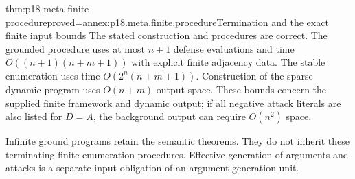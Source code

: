 \begin{hbtheorem}{thm:p18-meta-finite-procedure}{proved=annex:p18.meta.finite.procedure}{Termination and the exact finite input bounds}
The stated construction and procedures are correct.
The grounded procedure uses at most \(n+1\) defense evaluations
and time \(O((n+1)(n+m+1))\) with explicit finite adjacency data.
The stable enumeration uses time \(O(2^n(n+m+1))\).
Construction of the sparse dynamic program uses \(O(n+m)\)
output space. These bounds concern the supplied finite framework
and dynamic output; if all negative attack literals are also
listed for \(D=A\), the background output can require \(O(n^2)\)
space.

Infinite ground programs retain the semantic theorems. They do
not inherit these terminating finite enumeration procedures.
Effective generation of arguments and attacks is a separate
input obligation of an argument-generation unit.
\end{hbtheorem}

